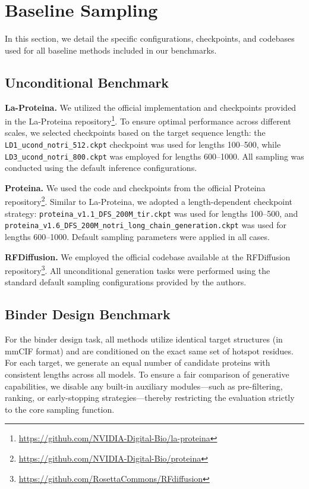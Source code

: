 \documentclass[]{bytedance_seed}
\begin{document}
\section{Baseline Sampling}
\label{app:baseline_sampling}

In this section, we detail the specific configurations, checkpoints, and codebases used for all baseline methods included in our benchmarks.

\subsection{Unconditional Benchmark}

\textbf{La-Proteina.} We utilized the official implementation and checkpoints provided in the La-Proteina repository\footnote{\url{https://github.com/NVIDIA-Digital-Bio/la-proteina}}. To ensure optimal performance across different scales, we selected checkpoints based on the target sequence length: the \texttt{LD1\_ucond\_notri\_512.ckpt} checkpoint was used for lengths 100--500, while \texttt{LD3\_ucond\_notri\_800.ckpt} was employed for lengths 600--1000. All sampling was conducted using the default inference configurations.

\textbf{Proteina.} We used the code and checkpoints from the official Proteina repository\footnote{\url{https://github.com/NVIDIA-Digital-Bio/proteina}}. Similar to La-Proteina, we adopted a length-dependent checkpoint strategy: \texttt{proteina\_v1.1\_DFS\_200M\_tir.ckpt} was used for lengths 100--500, and \texttt{proteina\_v1.6\_DFS\_200M\_notri\_long\_chain\_generation.ckpt} was used for lengths 600--1000. Default sampling parameters were applied in all cases.

\textbf{RFDiffusion.} We employed the official codebase available at the RFDiffusion repository\footnote{\url{https://github.com/RosettaCommons/RFdiffusion}}. All unconditional generation tasks were performed using the standard default sampling configurations provided by the authors.

\subsection{Binder Design Benchmark}
For the binder design task, all methods utilize identical target structures (in mmCIF format) and are conditioned on the exact same set of hotspot residues. For each target, we generate an equal number of candidate proteins with consistent lengths across all models. To ensure a fair comparison of generative capabilities, we disable any built-in auxiliary modules—such as pre-filtering, ranking, or early-stopping strategies—thereby restricting the evaluation strictly to the core sampling function.
\end{document}
